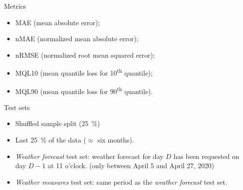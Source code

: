 \documentclass[12pt]{beamer}
\begin{document}
\begin{frame}{Metrics}
	\begin{itemize}
		\item MAE (mean absolute error);
		\item nMAE (normalized mean absolute error);
		\item nRMSE (normalized root mean squared error);
		\item MQL10 (mean quantile loss for \num{10}\textsuperscript{th} quantile);
		\item MQL90 (mean quantile loss for \num{90}\textsuperscript{th} quantile).
	\end{itemize}
\end{frame}

\begin{frame}{Test sets}
	\begin{itemize}
		\item Shuffled sample split (\SI{25}{\percent})
		\item Last \SI{25}{\percent} of the data ($\approx$ six months).
		\item \emph{Weather forecast} test set: weather forecast for day $D$ has been requested on day $D - 1$ at 11 o'clock. (only between April 5 and April 27, 2020) %
		\item \emph{Weather measures} test set: same period as the \emph{weather forecast} test set.
	\end{itemize}
\end{frame}
\end{document}
